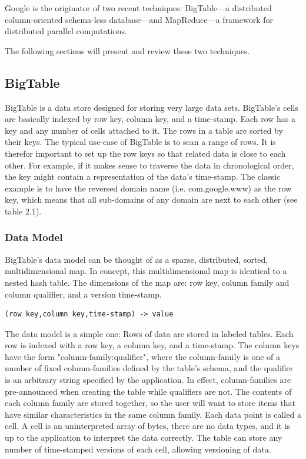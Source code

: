 Google is the originator of two recent techniques: BigTable---a distributed
column-oriented schema-less database---and MapReduce---a framework for
distributed parallel computations.

The following sections will present and review these two techniques.


\subsection{BigTable}

BigTable is a data store designed for storing very large data sets. BigTable's
cells are basically indexed by row key, column key, and a time-stamp. Each row
has a key and any number of cells attached to it. The rows in a table are sorted
by their keys. The typical use-case of BigTable is to scan a range of rows. It
is therefor important to set up the row keys so that related data is close to
each other. For example, if it makes sense to traverse the data in chronological
order, the key might contain a representation of the data's time-stamp. The
classic example is to have the reversed domain name (i.e. com.google.www) as the
row key, which means that all sub-domains of any domain are next to each other
(see table 2.1).


\subsubsection{Data Model}

BigTable's data model can be thought of as a sparse, distributed, sorted,
multidimensional map. In concept, this multidimensional map is identical to a
nested hash table. The dimensions of the map are: row key, column family and
column qualifier, and a version time-stamp.

\vspace{12pt}

\begin{lstlisting}[caption=BigTable data model illustration.,captionpos=b]
   (row key,column key,time-stamp) -> value
\end{lstlisting}

\vspace{12pt}

The data model is a simple one: Rows of data are stored in labeled tables. Each
row is indexed with a row key, a column key, and a time-stamp. The column keys
have the form "column-family:qualifier", where the column-family is one of a
number of fixed column-families defined by the table's schema, and the qualifier
is an arbitrary string specified by the application. In effect, column-families
are pre-announced when creating the table while qualifiers are not. The contents
of each column family are stored together, so the user will want to store items
that have similar characteristics in the same column family. Each data point is
called a cell. A cell is an uninterpreted array of bytes, there are no data
types, and it is up to the application to interpret the data correctly. The
table can store any number of time-stamped versions of each cell, allowing
versioning of data.

